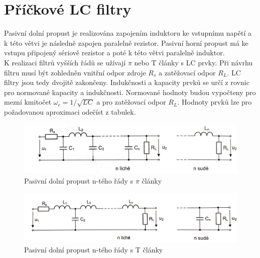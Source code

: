 \documentclass[twoside]{article}
\begin{document}
\section{Příčkové LC filtry}
Pasivní dolní propust je realizována zapojením induktoru ke vstupnímu napětí a k této větvi je následně zapojen paralelně rezistor. Pasivní horní propust má ke vstupu připojený sériově rezistor a poté k této větvi paralelně induktor. \\
K realizaci filtrů vyšších řádů se užívají $\pi$ nebo T články s LC prvky. Při návrhu filtru musí být zohledněn vnitřní odpor zdroje $R_s$ a zatěžovací odpor $R_L$. LC filtry jsou tedy dvojitě zakončeny. Indukčnosti a kapacity prvků se určí z rovnic pro normované kapacity a indukčnosti. Normované hodnoty budou vypočteny pro mezní kmitočet $\omega _c = 1/\sqrt{LC}$ a pro zatěžovací odpor $R_L$. Hodnoty prvků lze pro požadovanou aproximaci odečíst z tabulek. \\
\begin{figure}[H]
\centering
\includegraphics[scale=0.1]{piclanky.png}
\caption{Pasivní dolní propust n-tého řády s $\pi$ články \cite{10}}
\end{figure}
\begin{figure}[H]
\centering
\includegraphics[scale=0.08]{tclanky.png}
\caption{Pasivní dolní propust n-tého řády s T články \cite{10}}
\end{figure}
\newpage
\end{document}
